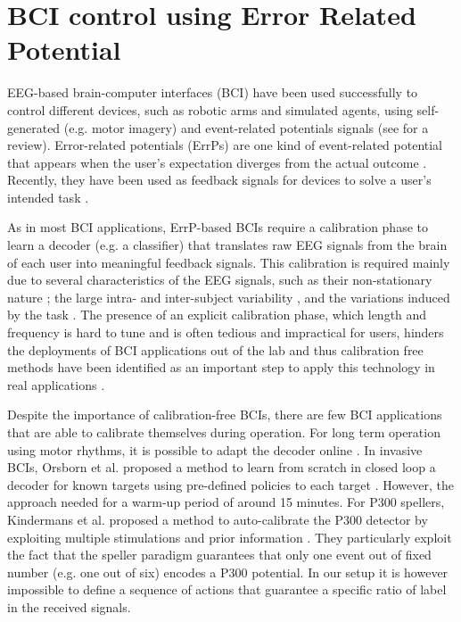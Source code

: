 \section{BCI control using Error Related Potential}

EEG-based brain-computer interfaces (BCI) have been used successfully to control different devices, such as robotic arms and simulated agents, using self-generated (e.g. motor imagery) and event-related potentials signals (see \cite{millan10} for a review). 
%
Error-related potentials (ErrPs) are one kind of event-related potential that appears when the user's expectation diverges from the actual outcome \cite{Falkenstein00}. Recently, they have been used as feedback signals for devices to solve a user's intended task \cite{chavarriaga2010learning,iturrate13}.

As in most BCI applications, ErrP-based BCIs require a calibration phase to learn a decoder (e.g. a classifier) that translates raw EEG signals from the brain of each user into meaningful feedback signals. This calibration is required mainly due to several characteristics of the EEG signals, such as their non-stationary nature \cite{vidaurre11}; the large intra- and inter-subject variability \cite{Polich1997}, and the variations induced by the task \cite{iturrate2013task}. The presence of an explicit calibration phase, which length and frequency is hard to tune and is often tedious and impractical for users, hinders the deployments of BCI applications out of the lab and thus calibration free methods have been identified as an important step to apply this technology in real applications \cite{millan10}.

Despite the importance of calibration-free BCIs, there are few BCI applications that are able to calibrate themselves during operation. For long term operation using motor rhythms, it is possible to adapt the decoder online \cite{vidaurre2010towards}. In invasive BCIs, Orsborn et al. proposed a method to learn from scratch in closed loop a decoder for known targets using pre-defined policies to each target \cite{Orsborn2012}. However, the approach needed for a warm-up period of around 15 minutes. For P300 spellers, Kindermans et al. proposed a method to auto-calibrate the P300 detector by exploiting multiple stimulations and prior information \cite{Kindermans2012a,Kindermans2012b,tangermann2013zero}. They particularly exploit the fact that the speller paradigm guarantees that only one event out of fixed number (e.g. one out of six) encodes a P300 potential. In our setup it is however impossible to define a sequence of actions that guarantee a specific ratio of label in the received signals.


